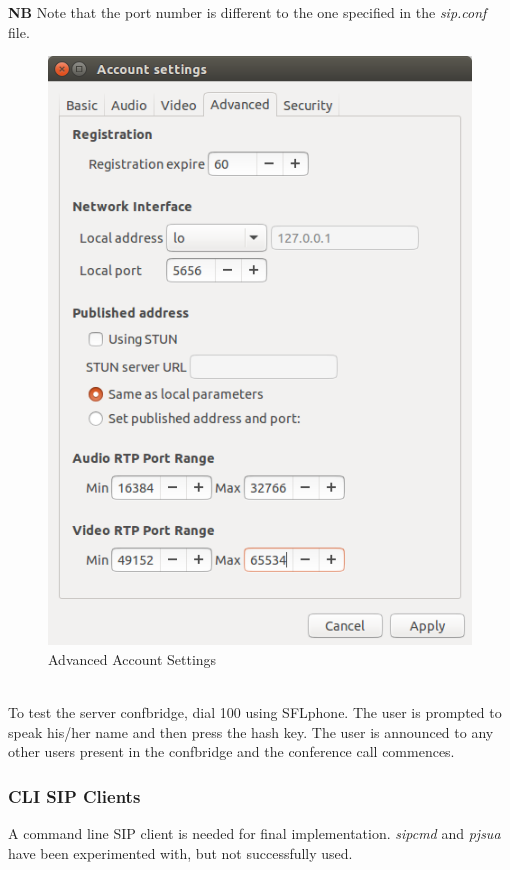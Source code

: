 \documentclass[a4paper,11pt]{report}
\begin{document}
\newpage
\textbf{NB} Note that the port number is different to the one specified in the \textit{sip.conf} file.
\begin{figure}[h]
  \begin{center}
    \includegraphics[scale = 0.4]{SIP_adv_settings}
    \caption{Advanced Account Settings}
  \end{center}
\end{figure}\\
To test the server confbridge, dial 100 using SFLphone. The user is prompted to speak his/her name and then press the hash key. The user is announced to any other users present in the confbridge  and the conference call commences.
\subsubsection{CLI SIP Clients}
A command line SIP client is needed for final implementation. \textit{sipcmd} and \textit{pjsua} have been experimented with, but not successfully used.
\end{document}
